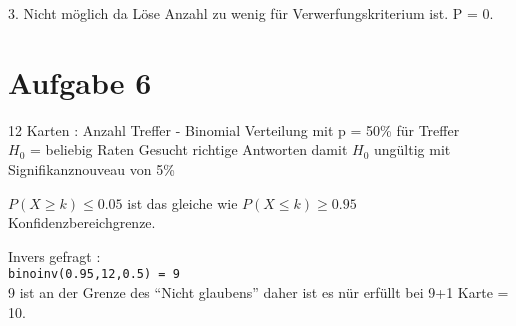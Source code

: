\documentclass[a4paper,10pt]{scrbook}
\begin{document}
3. Nicht möglich da Löse Anzahl zu wenig für Verwerfungskriterium ist. P = 0.

\section*{Aufgabe 6}
12 Karten : Anzahl Treffer - Binomial Verteilung mit p = 50\% für Treffer \\
$H_0$ = beliebig Raten
Gesucht richtige Antworten damit $H_0$ ungültig mit Signifikanznouveau  von 5\% \\

\begin{framed}
 $P(X \ge k) \le 0.05$ ist das gleiche wie $P(X \le k) \ge 0.95$ \\
 Konfidenzbereichgrenze.
\end{framed}
Invers gefragt : \\
\texttt{binoinv(0.95,12,0.5) = 9}\\
9 ist an der Grenze des ``Nicht glaubens'' daher ist es nür erfüllt bei 9+1 Karte = 10.
\end{document}
